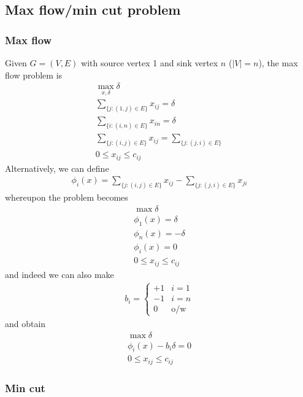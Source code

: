 \documentclass{../template/note}
\begin{document}
    \subsection{Max flow/min cut problem}

    \subsubsection{Max flow}

    Given $G = (V, E)$ with source vertex 1 and sink vertex $n$ ($|V| = n$), the max flow problem is
    \begin{align*}
        \max_{x, \delta} \delta \\
        \sum_{\{j: (1, j) \in E\}} x_{ij} = \delta \\
        \sum_{\{i: (i, n) \in E\}} x_{in} = \delta \\
        \sum_{\{j: (i, j) \in E\}} x_{ij} = \sum_{\{j: (j, i) \in E\}} \\
        0 \leq x_{ij} \leq c_{ij}
    \end{align*}
    Alternatively, we can define
    \begin{align*}
        \phi_i(x) = \sum_{\{j: (i, j) \in E\}} x_{ij} - \sum_{\{j: (j, i) \in E\}} x_{ji}
    \end{align*}
    whereupon the problem becomes
    \begin{align*}
        \max \delta \\
        \phi_1(x) = \delta \\
        \phi_n(x) = -\delta \\
        \phi_i(x) = 0 \\
        0 \leq x_{ij} \leq c_{ij}
    \end{align*}
    and indeed we can also make
    \begin{align*}
        b_i = \begin{cases}
            +1 & i=1 \\
            -1 & i=n \\
            0 & \text{o/w}
        \end{cases}
    \end{align*}
    and obtain
    \begin{align*}
        \max \delta \\
        \phi_i(x) - b_i\delta = 0 \\
        0 \leq x_{ij} \leq c_{ij}
    \end{align*}
    
    \subsubsection{Min cut}
\end{document}
